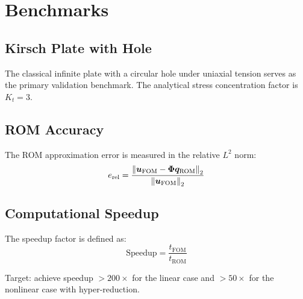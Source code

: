 \section{Benchmarks}
\label{sec:benchmarks}

\subsection{Kirsch Plate with Hole}

The classical infinite plate with a circular hole under uniaxial tension serves as the primary validation benchmark. The analytical stress concentration factor is $K_t = 3$.


\subsection{ROM Accuracy}

The ROM approximation error is measured in the relative $L^2$ norm:
\begin{equation}
    e_{\text{rel}} = \frac{\left\| \bm{u}_{\text{FOM}} - \mathbf{\Phi}\bm{q}_{\text{ROM}} \right\|_2}{\left\| \bm{u}_{\text{FOM}} \right\|_2}
\end{equation}


\subsection{Computational Speedup}

The speedup factor is defined as:
\begin{equation}
    \text{Speedup} = \frac{t_{\text{FOM}}}{t_{\text{ROM}}}
\end{equation}

Target: achieve speedup $> 200\times$ for the linear case and $> 50\times$ for the nonlinear case with hyper-reduction.

